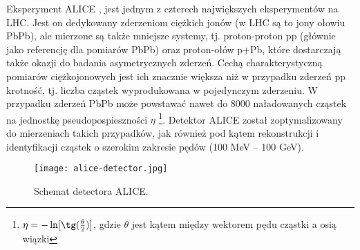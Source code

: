 Eksperyment ALICE \cite{Aamodt:2008zz}, \cite{Abelev:2014ffa} jest jednym z czterech największych eksperymentów na LHC. Jest on dedykowany zderzeniom ciężkich jonów (w LHC są to jony ołowiu PbPb), ale mierzone są także mniejsze systemy, tj. proton-proton pp (głównie jako referencję dla pomiarów PbPb) oraz proton-ołów p+Pb, które dostarczają także okazji do badania asymetrycznych zderzeń. Cechą charakterystyczną pomiarów ciężkojonowych jest ich znacznie większa niż w przypadku zderzeń pp krotność, tj. liczba cząstek wyprodukowana w pojedynczym zderzeniu. W przypadku zderzeń PbPb może powstawać nawet do 8000 naładowanych cząstek na jednostkę pseudopospieszności $\eta$  \footnote{$\eta = -\ln[\tg(\frac{\theta}{2})]$, gdzie $\theta$ jest kątem między wektorem pędu cząstki a osią wiązki}. Detektor ALICE został zoptymalizowany do mierzeniach takich przypadków, jak również pod kątem rekonstrukcji i identyfikacji cząstek o szerokim zakresie pędów (100 MeV -- 100 GeV).


\begin{figure}[h]
	\centering
	\texttt{[image: alice-detector.jpg]}
	\caption{Schemat detectora ALICE.  }
	\label{fig:alice-detector}
\end{figure}



